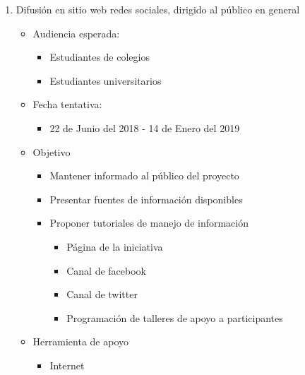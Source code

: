 \documentclass{article}
\begin{document}
\begin{enumerate}
\item Difusión en sitio web redes sociales, dirigido al público en general 
\begin{itemize}
\item Audiencia esperada:
\begin{itemize}
\item Estudiantes de colegios
\item Estudiantes universitarios
\end{itemize}
\item Fecha tentativa:
\begin{itemize}
\item 22 de Junio del 2018 - 14 de Enero del 2019
\end{itemize}
\item Objetivo
\begin{itemize}
\item Mantener informado al público del proyecto
\item Presentar fuentes de información disponibles
\item Proponer tutoriales de manejo de información
\begin{itemize}
\item Página de la iniciativa 
\item Canal de facebook
\item Canal de twitter
\item Programación de talleres de apoyo a participantes
\end{itemize}
\end{itemize}
\item Herramienta de apoyo
\begin{itemize}
\item Internet
\end{itemize}
\end{itemize}


\end{enumerate}
\end{document}
